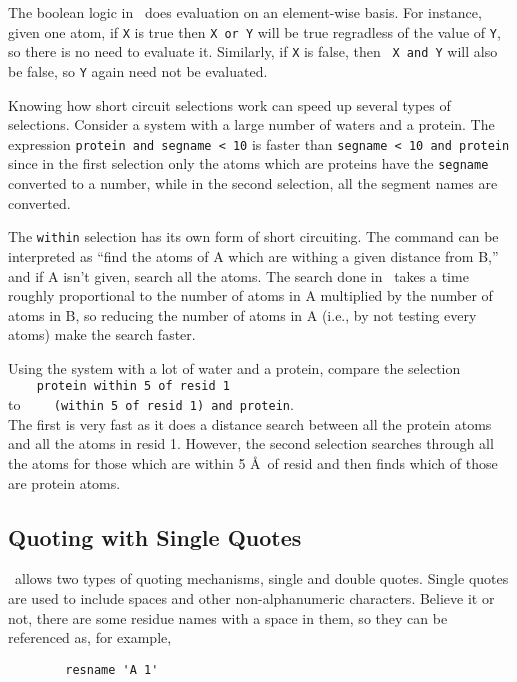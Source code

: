 The boolean logic in \VMD\ does
 evaluation on an 
element-wise basis.  For instance, given one atom, if {\tt X} is true
then {\tt X or Y} will be true regradless of the value of {\tt Y}, so there
is no need to evaluate it.  Similarly, if {\tt X} is false, then {\tt
X and Y} will also be false, so {\tt Y} again need not be evaluated.

Knowing how short circuit selections work can speed up several types
of selections.  Consider a system with a large number of waters and a
protein.  The expression \verb!protein and segname < 10! is faster
than \verb!segname < 10 and protein! since in the first selection only the
atoms which are proteins have the {\tt segname} converted to a number,
while in the second selection, all the segment names are converted.

The {\tt within} selection has its own form of short circuiting.  The
command can be interpreted as ``find the atoms of A which are withing
a given distance from B,'' and if A isn't given, search all the atoms.
The search done in \VMD\ takes a time roughly proportional to the
number of atoms in A multiplied by the number of atoms in B, so
reducing the number of atoms in A (i.e., by not testing every atoms)
make the search faster.

Using the system with a lot of water and a protein, compare the
selection \\ 
\verb!    protein within 5 of resid 1! \\
to
\verb!    (within 5 of resid 1) and protein!. \\
The first is very fast as it 
does a distance search between all the protein atoms and all the atoms
in resid 1.  However, the second selection searches through all the
atoms for those which are within 5 \AA\ of resid and then finds which
of those are protein atoms.


\subsection{Quoting with Single Quotes}
  \VMD\ allows two types of quoting mechanisms, single and
double quotes.  Single quotes are used to include spaces and other
non-alphanumeric characters.  Believe it or not, there are some
residue names with a space in them, so they can be referenced as, for
example, 

\begin{verbatim}
        resname 'A 1'
\end{verbatim}

